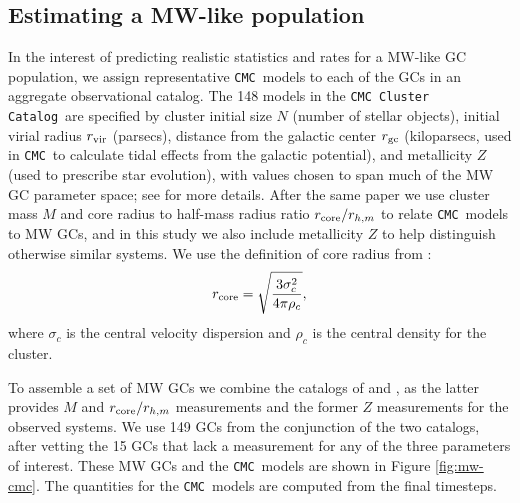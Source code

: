 \documentclass[twocolumn]{aastex631}
\newcommand{\CMC}{\texttt{CMC}}
\newcommand{\CMCcat}{\texttt{CMC Cluster Catalog}}
\begin{document}
\subsection{Estimating a MW-like population} \label{subsec:est_MW-like}


In the interest of predicting realistic statistics and rates for a MW-like GC population, we assign representative \CMC\ models to each of the GCs in an aggregate observational catalog.
The 148 models in the \CMCcat\ are specified by cluster initial size $N$ (number of stellar objects), initial virial radius $r_{\rm vir}$ (parsecs), distance from the galactic center $r_{\rm gc}$ (kiloparsecs, used in \CMC\ to calculate tidal effects from the galactic potential), and metallicity $Z$ (used to prescribe star evolution), with values chosen to span much of the MW GC parameter space; see \citet{2020IAUS..351..357K} for more details.
After the same paper we use cluster mass $M$ and core radius to half-mass radius ratio $r_{\rm core} / r_{h,m}$ to relate \CMC\ models to MW GCs, and in this study we also include metallicity $Z$ to help distinguish otherwise similar systems.
We use the definition of core radius from \citet{1987degc.book.....S}:
\begin{equation}
    r_{\rm core} = \sqrt{\frac{3 \sigma_c^2}{4 \pi \rho_c}},
\end{equation}
where $\sigma_c$ is the central velocity dispersion and $\rho_c$ is the central density for the cluster.

To assemble a set of MW GCs we combine the catalogs of \citet{2010arXiv1012.3224H} and \citet{2018MNRAS.478.1520B}, as the latter provides $M$ and $r_{\rm core} / r_{h,m}$ measurements and the former $Z$ measurements for the observed systems.
We use 149 GCs from the conjunction of the two catalogs, after vetting the 15 GCs that lack a measurement for any of the three parameters of interest.
These MW GCs and the \CMC\ models are shown in Figure \ref{fig:mw-cmc}.
The quantities for the \CMC\ models are computed from the final timesteps.

\end{document}
